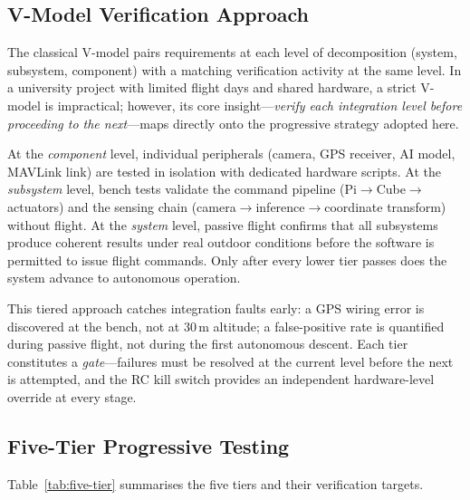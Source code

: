 \subsection{V-Model Verification Approach}\label{sec:vmodel}

The classical V-model pairs requirements at each level of decomposition (system, subsystem, component) with a matching verification activity at the same level. In a university project with limited flight days and shared hardware, a strict V-model is impractical; however, its core insight---\emph{verify each integration level before proceeding to the next}---maps directly onto the progressive strategy adopted here.

At the \emph{component} level, individual peripherals (camera, GPS receiver, AI model, MAVLink link) are tested in isolation with dedicated hardware scripts. At the \emph{subsystem} level, bench tests validate the command pipeline (Pi$\to$Cube$\to$actuators) and the sensing chain (camera$\to$inference$\to$coordinate transform) without flight. At the \emph{system} level, passive flight confirms that all subsystems produce coherent results under real outdoor conditions before the software is permitted to issue flight commands. Only after every lower tier passes does the system advance to autonomous operation.

This tiered approach catches integration faults early: a GPS wiring error is discovered at the bench, not at 30\,m altitude; a false-positive rate is quantified during passive flight, not during the first autonomous descent. Each tier constitutes a \emph{gate}---failures must be resolved at the current level before the next is attempted, and the RC kill switch provides an independent hardware-level override at every stage.

\subsection{Five-Tier Progressive Testing}\label{sec:five-tier}

Table~\ref{tab:five-tier} summarises the five tiers and their verification targets.

